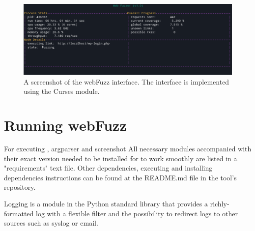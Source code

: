 \begin{figure}[ht]
 \centering
 \captionsetup{justification=centering}
 \includegraphics[width=4.6in]{figures/curses.png}
 \caption{A screenshot of the webFuzz interface. The interface is implemented using the Curses module.}
 \label{fig:curses_interface}
\end{figure}


\section{Running webFuzz}
For executing \pname{}, argparser and screenshot
All necessary modules accompanied with their exact version needed to be installed for \pname{} to work smoothly are listed in a "requirements" text file. Other dependencies, executing and installing dependencies instructions can be found at the README.md file in the tool's repository.

Logging is a module in the Python standard library that provides a richly-formatted log with a flexible filter and the possibility to redirect logs to other sources such as syslog or email.
